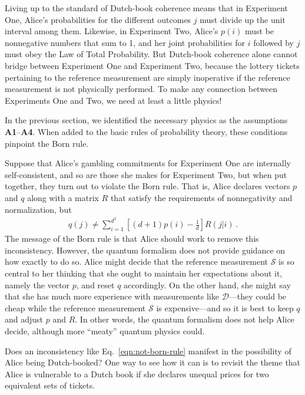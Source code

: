 \documentclass[%
 reprint,superscriptaddress,
 amsmath,amssymb,
 aps,pra, onecolumn, 12pt
]{revtex4-2}
\newcommand{\eqn}[1]{\begin{eqnarray} #1 \end{eqnarray}}
\newcommand{\zum}[2]{\displaystyle\sum_{#1}^{#2}}
\newcommand{\onestage}{{One}}
\newcommand{\twostage}{{Two}}
\begin{document}
Living up to the standard of Dutch-book coherence means that in Experiment \onestage, Alice's probabilities for the different outcomes $j$ must divide up the unit interval among them. Likewise, in Experiment \twostage{}, Alice's $p(i)$ must be nonnegative numbers that sum to 1, and her joint probabilities for $i$ followed by $j$ must obey the Law of Total Probability. But Dutch-book coherence alone cannot bridge between Experiment \onestage{} and Experiment \twostage, because the lottery tickets pertaining to the reference measurement are simply inoperative if the reference measurement is not physically performed. To make any connection between Experiments \onestage{} and \twostage, we need at least a little physics!

In the previous section, we identified the necessary physics as the assumptions {\bf A1}--{\bf A4}. When added to the basic rules of probability theory, these conditions pinpoint the Born rule.

Suppose that Alice's gambling commitments for Experiment \onestage{} are internally self-consistent, and so are those she makes for Experiment \twostage, but when put together, they turn out to violate the Born rule. That is, Alice declares vectors $p$ and $q$ along with a matrix $R$ that satisfy the requirements of nonnegativity and normalization, but
\eqn{
  q(j) \neq \zum{i=1}{d^2} \left[(d+1) p(i) - \frac{1}{d}\right] R(j|i) \, .
  \label{eqn:not-born-rule}
}
The message of the Born rule is that Alice should work to remove this inconsistency. However, the quantum formalism does not provide guidance on how exactly to do so. Alice might decide that the reference measurement $\mathcal{S}$ is so central to her thinking that she ought to maintain her expectations about it, namely the vector $p$, and reset $q$ accordingly. On the other hand, she might say that she has much more experience with measurements like $\mathcal{D}$---they could be cheap while the reference measurement $\mathcal{S}$ is expensive---and so it is best to keep $q$ and adjust $p$ and $R$. In other words, the quantum formalism does not help Alice decide, although more ``meaty'' quantum physics could.

Does an inconsistency like Eq.\ \eqref{eqn:not-born-rule} manifest in the possibility of Alice being Dutch-booked? One way to see how it can is to revisit the theme that Alice is vulnerable to a Dutch book if she declares unequal prices for two equivalent sets of tickets.
\end{document}
